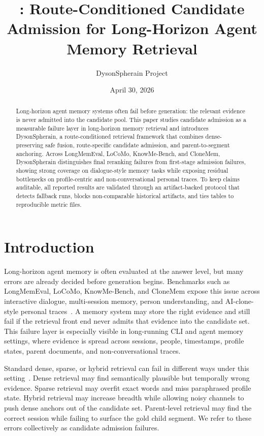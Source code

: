 \documentclass[10pt]{article}
\title{\system: Route-Conditioned Candidate Admission for Long-Horizon Agent Memory Retrieval}
\author{DysonSpherain Project}
\date{April 30, 2026}
\newcommand{\system}{DysonSpherain}
\begin{document}
\maketitle

\begin{abstract}
Long-horizon agent memory systems often fail before generation: the relevant
evidence is never admitted into the candidate pool. This paper studies
candidate admission as a measurable failure layer in long-horizon memory
retrieval and introduces \system{}, a route-conditioned retrieval framework
that combines dense-preserving safe fusion, route-specific candidate admission,
and parent-to-segment anchoring. Across LongMemEval, LoCoMo, KnowMe-Bench, and
CloneMem, \system{} distinguishes final reranking failures from first-stage
admission failures, showing strong coverage on dialogue-style memory tasks
while exposing residual bottlenecks on profile-centric and non-conversational
personal traces. To keep claims auditable, all reported results are validated
through an artifact-backed protocol that detects fallback runs, blocks
non-comparable historical artifacts, and ties tables to reproducible metric
files.
\end{abstract}

\section{Introduction}

Long-horizon agent memory is often evaluated at the answer level, but many
errors are already decided before generation begins. Benchmarks such as
LongMemEval, LoCoMo, KnowMe-Bench, and CloneMem expose this issue across
interactive dialogue, multi-session memory, person understanding, and
AI-clone-style personal traces~\cite{wu2024longmemeval,maharana2024locomo,wu2026knowme,hu2026clonemem}.
A memory system may store the right evidence and still fail if the retrieval
front end never admits that evidence into the candidate set. This failure layer
is especially visible in long-running CLI and agent memory settings, where
evidence is spread across sessions, people, timestamps, profile states, parent
documents, and non-conversational traces.

Standard dense, sparse, or hybrid retrieval can fail in different ways under
this setting~\cite{robertson2009probabilistic,karpukhin2020dense,cormack2009rrf}.
Dense retrieval may find semantically plausible but temporally wrong evidence.
Sparse retrieval may overfit exact words and miss paraphrased profile state.
Hybrid retrieval may increase breadth while allowing noisy channels to push
dense anchors out of the candidate set. Parent-level retrieval may find the
correct session while failing to surface the gold child segment. We refer to
these errors collectively as candidate admission failures.
\end{document}

